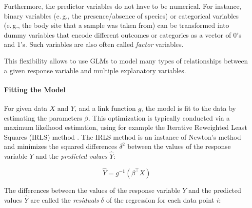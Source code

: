 Furthermore, the predictor variables do not have to be numerical.
For instance, binary variables (e.\,g., the presence/absence of species)
or categorical variables (e.\,g., the body site that a sample was taken from) can be transformed into dummy variables
that encode different outcomes or categories as a vector of $0$'s and $1$'s.
Such variables are also often called \emph{factor} variables.

This flexibility allows to use \acp{GLM} to model many types of relationships
between a given response variable and multiple explanatory variables.


\paragraph{Fitting the Model}
\label{ch:Factorization:sec:Methods:sub:GLMs:par:Fitting}

For given data $X$ and $Y$, and a link function $g$, the model is fit to the data by estimating the parameters $\beta$.
This optimization is typically conducted via a maximum likelhood estimation,
using for example the Iterative Reweighted Least Squares (IRLS) method \cite{Burrus2012}.
The IRLS method is an instance of Newton's method \cite{Ypma1995}
and minimizes the squared differences $\delta^2$ between the values of the response variable $Y$
and the \emph{predicted values} $\hat{Y}$:


\begin{equation}
    \label{ch:Factorization:sub:GLM:eq:predicted}
    \hat{Y} = g^{-1}(\beta^\intercal X)
\end{equation}

The differences between the values of the response variable $Y$ and the predicted values $\hat{Y}$
are called the \emph{residuals} $\delta$ of the regression for each data point $i$:

